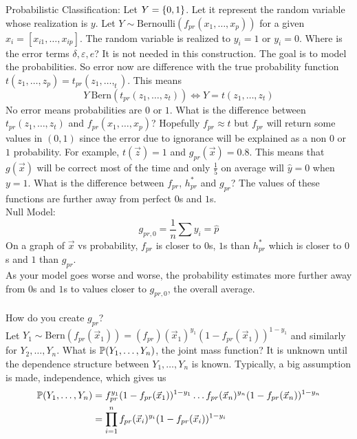 \documentclass[12pt]{article}
\begin{document}
Probabilistic Classification: Let $Y = \left\{ 0,1 \right\}$. Let it represent the random variable whose realization is $y$. Let $Y \sim \text{Bernoulli}(f_{pr}(x_1,\dots,x_p))$ for a given $\hat{x}_i = [x_{i1}, \dots, x_{ip}]$. The random variable is realized to $y_i = 1$ or $y_i = 0$. Where is the error terms $\delta, \varepsilon, e$? It is not needed in this construction. The goal is to model the probabilities. So error now are difference with the true probability function $t(z_1,\dots,z_p) = t_{pr}(z_1,\dots,_t)$. This means $$ Y~\text{Bern}(t_{pr}(z_1,\dots,z_t)) \iff Y = t(z_1,\dots,z_t) $$ 
No error means probabilities are $0$ or $1$. What is the difference between $t_{pr}(z_1,\dots,z_t)$ and $f_{pr}(x_1,\dots,x_p)$? Hopefully $f_{pr} \approx t$ but $f_{pr}$ will return some values in $(0,1)$ since the error due to ignorance will be explained as a non $0$ or $1$ probability. For example, $t(\vec{z}) = 1$ and $g_{pr}(\vec{x}) = 0.8$. This means that $g(\vec{x})$ will be correct most of the time and only $\frac{1}{5}$ on average will $\hat{y} = 0$ when $y = 1$. What is the difference between $f_{pr}$, $h^*_{pr}$ and $g_{pr}$? The values of these functions are further away from perfect $0$s and $1$s. \\
Null Model: $$g_{pr,0} = \frac{1}{n}\sum y_i = \hat{p} $$ On a graph of $\vec{x}$ vs probability, $f_{pr}$ is closer to $0$s, $1$s than $h^*_{pr}$ which is closer to $0$s and $1$ than $g_{pr}$. \\ As your model goes worse and worse, the probability estimates more further away from $0$s and $1$s to values closer to $g_{pr,0}$, the overall average. \\~\\
How do you create $g_{pr}$? \\
Let $Y_1 \sim \text{Bern}(f_{pr}(\vec{x}_1)) = (f_{pr})(\vec{x}_1)^{y_1}(1 - f_{pr}(\vec{x}_1))^{1 - y_1}$ and similarly for $Y_2,\dots, Y_n$. What is $\mathbb{P}(Y_1,\dots,Y_n)$, the joint mass function? It is unknown until the dependence structure between $Y_1,\dots,Y_n$ is known. Typically, a big assumption is made, independence, which gives us $$ \begin{aligned} \mathbb{P}(Y_1,\dots,Y_n) &= f_{pr}^{y_1}(1 - f_{pr}(\vec{x}_1))^{1-y_1} \dots f_{pr}(\vec{x}_n)^{y_n}(1 - f_{pr}(\vec{x}_n))^{1 - y_n} \\ &= \prod_{i=1}^n f_{pr}(\vec{x}_i)^{y_i}(1-f_{pr}(\vec{x}_i))^{1-y_i} \end{aligned} $$ 
\end{document}
